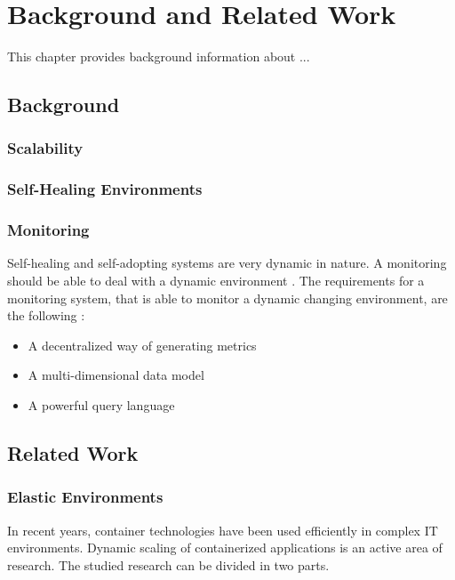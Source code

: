 \chapter{Background and Related Work}
\label{sec:related}
%

This chapter provides background information about ...

\section{Background}

\subsection{Scalability}

\subsection{Self-Healing Environments}

\subsection{Monitoring}
Self-healing and self-adopting systems are very dynamic in nature. A monitoring should be able to deal with a dynamic environment \cite{Farcic2017Toolkit21}.
The requirements for a monitoring system, that is able to monitor a dynamic changing environment, are the following \cite{Farcic2017Toolkit21}:
\begin{itemize}
\item A decentralized way of generating metrics %
\item A multi-dimensional data model %
\item A powerful query language
\end{itemize}



\section{Related Work}
\subsection{Elastic Environments}
In recent years, container technologies have been used efficiently in complex IT environments. Dynamic scaling of containerized applications is an active area of research. The studied research can be divided in two parts. 


